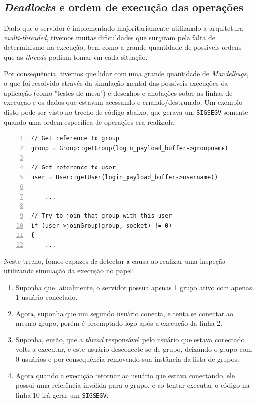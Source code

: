 \documentclass{article}
\begin{document}
\subsection{\textit{Deadlocks} e ordem de execução das operações}
\par Dado que o servidor é implementado majoritariamente utilizando a arquitetura \textit{multi-threaded}, tivemos muitas dificuldades que surgiram pela falta de determinismo na execução, bem como a grande quantidade de possíveis ordens que as \textit{threads} podiam tomar em cada situação.
\par Por consequência, tivemos que lidar com uma grande quantidade de \textit{Mandelbugs}, o que foi resolvido através da simulação mental das possíveis execuções da aplicação (como "testes de mesa") e desenhos e anotações sobre as linhas de execução e os dados que estavam acessando e criando/destruindo. Um exemplo disto pode ser visto no trecho de código abaixo, que gerava um \texttt{SIGSEGV} somente quando uma ordem específica de operações era realizada:
\\
\begin{lstlisting}[numbers=left, stepnumber=1]
// Get reference to group
group = Group::getGroup(login_payload_buffer->groupname)

// Get reference to user
user = User::getUser(login_payload_buffer->username))

    ...

// Try to join that group with this user
if (user->joinGroup(group, socket) != 0)
{
    ...
\end{lstlisting}
\par Neste trecho, fomos capazes de detectar a causa ao realizar uma inspeção utilizando simulação da execução no papel:
\begin{enumerate}
    \item Suponha que, atualmente, o servidor possua apenas 1 grupo ativo com apenas 1 usuário conectado.
    \item Agora, suponha que um segundo usuário conecta, e tenta se conectar ao mesmo grupo, porém é preemptado logo após a execução da linha 2.
    \item Suponha, então, que a \textit{thread} responsável pelo usuário que estava conectado volte a executar, e este usuário desconecte-se do grupo, deixando o grupo com 0 usuários e por consequência removendo sua instância da lista de grupos.
    \item Agora quando a execução retornar ao usuário que estava conectando, ele possui uma referência inválida para o grupo, e ao tentar executar o código na linha 10 irá gerar um \texttt{SIGSEGV}.
\end{enumerate}
\end{document}
